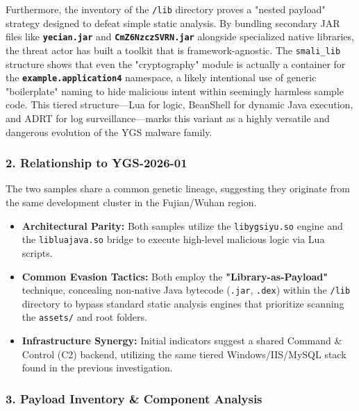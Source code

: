 \documentclass[
]{article}
\begin{document}
Furthermore, the inventory of the \texttt{/lib} directory proves a
"nested payload" strategy designed to defeat simple static analysis. By
bundling secondary JAR files like \textbf{\texttt{yecian.jar}} and
\textbf{\texttt{CmZ6NzczSVRN.jar}} alongside specialized native
libraries, the threat actor has built a toolkit that is
framework-agnostic. The \texttt{smali\_lib} structure shows that even
the "cryptography" module is actually a container for the
\textbf{\texttt{example.application4}} namespace, a likely intentional
use of generic "boilerplate" naming to hide malicious intent within
seemingly harmless sample code. This tiered structure---Lua for logic,
BeanShell for dynamic Java execution, and ADRT for log
surveillance---marks this variant as a highly versatile and dangerous
evolution of the YGS malware family.

\subsubsection{\texorpdfstring{\textbf{2. Relationship to
YGS-2026-01}}{2. Relationship to YGS-2026-01}}\label{2-relationship-to-ygs-2026-01}

The two samples share a common genetic lineage, suggesting they
originate from the same development cluster in the Fujian/Wuhan region.

\begin{itemize}
\item
  \textbf{Architectural Parity:} Both samples utilize the
  \texttt{libygsiyu.so} engine and the \texttt{libluajava.so} bridge to
  execute high-level malicious logic via Lua scripts.
\item
  \textbf{Common Evasion Tactics:} Both employ the
  \textbf{"Library-as-Payload"} technique, concealing non-native Java
  bytecode (\texttt{.jar}, \texttt{.dex}) within the \texttt{/lib}
  directory to bypass standard static analysis engines that prioritize
  scanning the \texttt{assets/} and root folders.
\item
  \textbf{Infrastructure Synergy:} Initial indicators suggest a shared
  Command \& Control (C2) backend, utilizing the same tiered
  Windows/IIS/MySQL stack found in the previous investigation.
\end{itemize}

\subsubsection{\texorpdfstring{\textbf{3. Payload Inventory \& Component
Analysis}}{3. Payload Inventory \& Component Analysis}}\label{3-payload-inventory--component-analysis}
\end{document}
